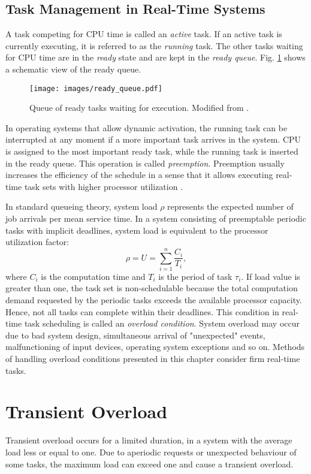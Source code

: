\subsection{Task Management in Real-Time Systems}
A task competing for CPU time is called an \textit{active} task.
If an active task is currently executing, it is referred to as the \textit{running} task.
The other tasks waiting for CPU time are in the \textit{ready} state and are kept in the \textit{ready queue}.
Fig. \ref{ready_queue} shows a schematic view of the ready queue.
\begin{figure}[ht]
    \centering
    \texttt{[image: images/ready\_queue.pdf]}
    \caption{Queue of ready tasks waiting for execution. Modified from \cite{buttazzo2011hard}.}
    \label{ready_queue}
\end{figure}
In operating systems that allow dynamic activation, the running task can be interrupted at any moment if a more important task arrives in the system.
CPU is assigned to the most important ready task, while the running task is inserted in the ready queue.
This operation is called \textit{preemption}.
Preemption usually increases the efficiency of the schedule in a sense that it allows executing real-time task sets with higher processor utilization \cite{buttazzo2011hard}.

In standard queueing theory, system load $\rho$ represents the expected number of job arrivals per mean service time. 
In a system consisting of preemptable periodic tasks with implicit deadlines, system load is equivalent to the processor utilization factor:
\begin{equation*}
\rho = U = \sum_{i=1}^{n}\frac{C_i}{T_i},
\end{equation*}
where $C_i$ is the computation time and $T_i$ is the period of task $\tau_i$.
If load value is greater than one, the task set is non-schedulable because the total computation demand requested by the periodic tasks exceeds the available processor capacity.
Hence, not all tasks can complete within their deadlines.
This condition in real-time task scheduling is called an \textit{overload condition}.
System overload may occur due to bad system design, simultaneous arrival of "unexpected" events, malfunctioning of input devices, operating system exceptions and so on.
Methods of handling overload conditions presented in this chapter consider firm real-time tasks.

\section{Transient Overload}
Transient overload occurs for a limited duration, in a system with the average load less or equal to one.
Due to aperiodic requests or unexpected behaviour of some tasks, the maximum load can exceed one and cause a transient overload.


